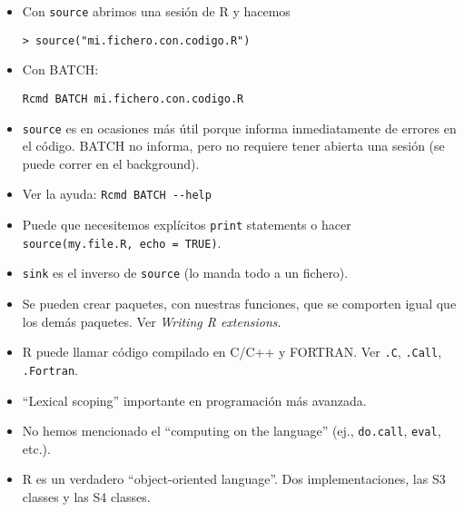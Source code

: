 \begin{itemize}
\item Con \verb"source" abrimos una sesión de R y hacemos
\begin{verbatim}
> source("mi.fichero.con.codigo.R")
\end{verbatim}

\item Con BATCH:
\begin{verbatim}
Rcmd BATCH mi.fichero.con.codigo.R
\end{verbatim}

\item \verb"source" es en ocasiones más útil porque informa
inmediatamente de errores en el código. BATCH no informa, pero no
requiere tener abierta una sesión (se puede correr en el
background).

\item Ver la ayuda: \verb"Rcmd BATCH --help"

\item Puede que necesitemos explícitos \verb"print" statements o
hacer \verb"source(my.file.R, echo = TRUE)".

\item \verb"sink" es el inverso de \verb"source" (lo manda todo a
un fichero).

\item Se pueden crear paquetes, con nuestras funciones, que se
comporten igual que los demás paquetes. Ver \emph{Writing R
extensions}.

\item R puede llamar código compilado en C/C++ y FORTRAN. Ver
\verb".C", \verb".Call", \verb".Fortran".

\item ``Lexical scoping'' importante en programación más avanzada.

\item No hemos mencionado el ``computing on the language'' (ej.,
\verb"do.call", \verb"eval", etc.).

\item R es un verdadero ``object-oriented language''. Dos
implementaciones, las S3 classes y las S4 classes.

\end{itemize}

\endinput
